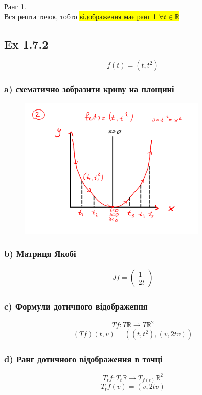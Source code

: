 \documentclass[10pt, a4paper]{article} %
\newcommand{\R}{\mathbb{R}}
\begin{document}
Ранг 1.\\
Вся решта точок, тобто \colorbox{yellow}{відображення має ранг 1 $\forall t \in \R$}


\subsection*{Ex 1.7.2}
\[f(t) = (t, t^2)\]

\subsubsection*{a) схематично зобразити криву на площині}
\begin{figure}[h]
    \includegraphics[width=0.8\textwidth]{1.7.2.png}
    \centering
\end{figure}


\subsubsection*{b) Матриця Якобі}
\begin{align*}
    Jf = \begin{pmatrix}
        1 \\ 2t
    \end{pmatrix}
\end{align*}

\subsubsection*{c) Формули дотичного відображення}
\[Tf : T\R \to T\R^2\]
\begin{align*}
    (Tf)(t, v) = \left((t, t^2), (v , 2tv)\right)
\end{align*}

\subsubsection*{d) Ранг дотичного відображення в точці}
\[T_{t}f: T_{t}\R \to T_{f(t)}\R^2\]
\[T_{t}f(v) = (v , 2tv)\]
\end{document}
